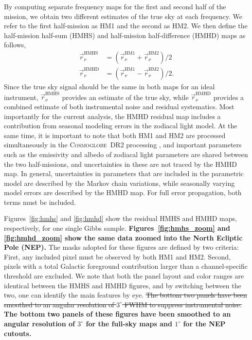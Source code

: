 \documentclass{aa}
\renewcommand{\r}[0]{\vec{r}}
\newcommand{\cosmoglobe}{\textsc{Cosmoglobe}}
\begin{document}
By computing separate
frequency maps for the first and second half of the mission, we obtain
two different estimates of the true sky at each frequency. We
refer to the first half-mission as HM1 and the second as HM2. We then
define the half-mission half-sum (HMHS) and half-mission
half-difference (HMHD) maps as follows,
\begin{align}
\r_{\nu}^{\mathrm{HMHS}} &= (\r_{\nu}^{\mathrm{HM1}} + \r_{\nu}^{\mathrm{HM2}})/2\\
\r_{\nu}^{\mathrm{HMHD}} &= (\r_{\nu}^{\mathrm{HM1}} -
\r_{\nu}^{\mathrm{HM2}})/2.
\end{align}
Since the true sky signal should be the same in both maps for an ideal
instrument, $\r_{\nu}^{\mathrm{HMHS}}$ provides an estimate of the
true sky, while $\r_{\nu}^{\mathrm{HMHD}}$ provides a combined
estimate of both instrumental noise and residual systematics. Most
importantly for the current analysis, the HMHD residual map includes a
contribution from seasonal modeling errors in the zodiacal light
model. At the same time, it is important to note that both HM1 and HM2
are processed simultaneously in the \cosmoglobe\ DR2 processing
\citep{CG02_01}, and important parameters such as the emissivity and
albedo of zodiacal light parameters are shared between the two
half-missions, and uncertainties in these are not traced by the HMHD
map. In general, uncertainties in parameters that are included in the
parametric model are described by the Markov chain variations, while
seasonally varying model errors are described by the HMHD map. For
full error propagation, both terms must be included.

Figures~\ref{fig:hmhs} and \ref{fig:hmhd} show the residual HMHS and
HMHD maps, respectively, for one single Gibbs sample. 
\textbf{Figures~\ref{fig:hmhs_zoom} and \ref{fig:hmhd_zoom} show the same data zoomed into the North Ecliptic Pole (NEP).}
The masks adopted for these figures are defined by two criteria: First, any
included pixel must be observed by both HM1 and HM2. Second, pixels
with a total Galactic foreground contribution larger than a
channel-specific threshold are excluded. We note that both the panel
layout and color ranges are identical between the HMHS and HMHD
figures, and by switching between the two, one can identify
the main features by eye. \sout{The bottom two panels have been smoothed to
an angular resolution of $3^{\circ}$ FWHM to suppress instrumental noise.}
\textbf{The bottom two panels of these figures have been smoothed to an angular resolution of $3^{\circ}$ for the full-sky maps and $1^\circ$ for the NEP cutouts.}
\end{document}
